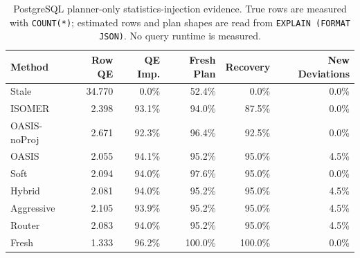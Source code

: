 \begin{table}[t]
  \centering
  \small
  \caption{PostgreSQL planner-only statistics-injection evidence. True rows are measured with \texttt{COUNT(*)}; estimated rows and plan shapes are read from \texttt{EXPLAIN (FORMAT JSON)}. No query runtime is measured.}
  \label{tab:postgres_planner_stats_injection}
  \setlength{\tabcolsep}{4pt}
  \begin{tabular}{lrrrrr}
    \toprule
    Method & Row QE & QE Imp. & Fresh Plan & Recovery & New Deviations \\
    \midrule
    Stale & 34.770 & 0.0\% & 52.4\% & 0.0\% & 0.0\% \\
    ISOMER & 2.398 & 93.1\% & 94.0\% & 87.5\% & 0.0\% \\
    OASIS-noProj & 2.671 & 92.3\% & 96.4\% & 92.5\% & 0.0\% \\
    OASIS & 2.055 & 94.1\% & 95.2\% & 95.0\% & 4.5\% \\
    Soft & 2.094 & 94.0\% & 97.6\% & 95.0\% & 0.0\% \\
    Hybrid & 2.081 & 94.0\% & 95.2\% & 95.0\% & 4.5\% \\
    Aggressive & 2.105 & 93.9\% & 95.2\% & 95.0\% & 4.5\% \\
    Router & 2.083 & 94.0\% & 95.2\% & 95.0\% & 4.5\% \\
    Fresh & 1.333 & 96.2\% & 100.0\% & 100.0\% & 0.0\% \\
    \bottomrule
  \end{tabular}
\end{table}
